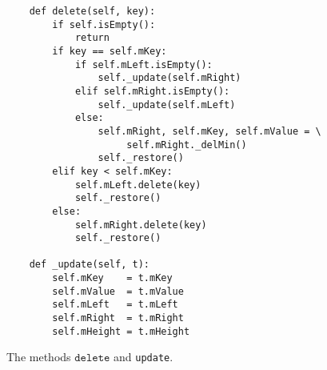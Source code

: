 \begin{figure}[!ht]
\centering
\begin{verbatim}
    def delete(self, key):
        if self.isEmpty():
            return
        if key == self.mKey:
            if self.mLeft.isEmpty():
                self._update(self.mRight)
            elif self.mRight.isEmpty():
                self._update(self.mLeft)
            else:
                self.mRight, self.mKey, self.mValue = \
                     self.mRight._delMin()
                self._restore()
        elif key < self.mKey:
            self.mLeft.delete(key)
            self._restore()
        else:
            self.mRight.delete(key)
            self._restore() 

    def _update(self, t):
        self.mKey    = t.mKey
        self.mValue  = t.mValue
        self.mLeft   = t.mLeft
        self.mRight  = t.mRight
        self.mHeight = t.mHeight            
\end{verbatim}
\vspace*{-0.3cm}
\caption{The methods $\texttt{delete}$ and \texttt{update}.}
\label{fig:avl-tree.ipython:delete}
\end{figure}
